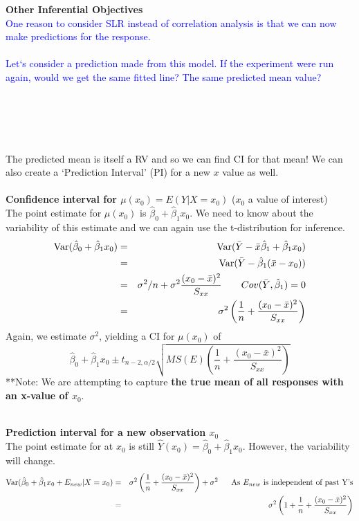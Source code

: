 \newpage

\Large \textbf{Other Inferential Objectives}\large\\
\textcolor{blue}{One reason to consider SLR instead of correlation analysis is that we can now make predictions for the response.\\~\\
Let`s consider a prediction made from this model.  If the experiment were run again, would we get the same fitted line? The same predicted mean value?} \\~\\~\\~\\~\\~\\

The predicted mean is itself a RV and so we can find CI for that mean!  We can also create a `Prediction Interval' (PI) for a new $x$ value as well.\\~\\

\textbf{Confidence interval for $\mu(x_0) = E(Y|X=x_0)$} ($x_0$ a value of interest)\\
The point estimate for $\mu(x_0)$ is $\hat\beta_0+\hat\beta_1x_0$.  We need to know about the variability of this estimate and we can again use the t-distribution for inference.
\begin{eqnarray*}
\mbox{Var}(\hat\beta_0+\hat\beta_1 x_0)
& = & \mbox{Var}(\bar{Y}-\bar{x}\hat{\beta}_1+\hat{\beta}_1 x_0)\\
& = & \mbox{Var}(\bar{Y}-\hat{\beta}_1(\bar{x}-x_0))\\
& = & \sigma^2/n + \sigma^2\frac{(x_0-\bar{x})^2}{S_{xx}}~~~~~~Cov(\bar{Y},\hat{\beta}_1)=0\\
& = & \sigma^2\left(\frac{1}{n} + \frac{(x_0-\bar{x})^2}{S_{xx}}\right)
\end{eqnarray*}
Again, we estimate $\sigma^2$, yielding a CI for $\mu(x_0)$ of
$$\hat\beta_0 +\hat\beta_1 x_0 \pm t_{n-2,\alpha/2} \sqrt{MS(E)\left(\frac{1}{n}+\frac{(x_0-\bar{x})^2}{S_{xx}}\right)} $$
**Note: We are attempting to capture \textbf{the true mean of all responses with an x-value of $x_0$}.\\~\\

\newpage

\textbf{Prediction interval for a new observation $x_0$}\\
The point estimate for at $x_0$ is still $\hat{Y}(x_0)=\hat\beta_0+\hat\beta_1x_0$.  However, the variability will change.
\begin{eqnarray*}
\mbox{Var}(\hat\beta_0+\hat\beta_1 x_0+E_{new}|X=x_0)
& = & \sigma^2\left(\frac{1}{n} + \frac{(x_0-\bar{x})^2}{S_{xx}}\right)+\sigma^2~~~~~\mbox{As }E_{new}\mbox{ is independent of past Y's}\\
& = & \sigma^2\left(1+\frac{1}{n} + \frac{(x_0-\bar{x})^2}{S_{xx}}\right)
\end{eqnarray*}

